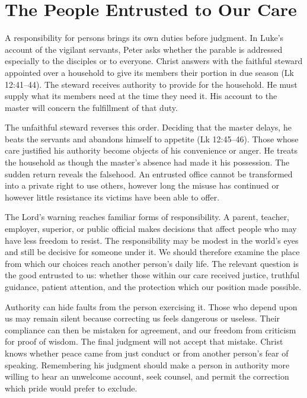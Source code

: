 \section{The People Entrusted to Our Care}

A responsibility for persons brings its own duties before judgment. In Luke's account of the vigilant servants, Peter asks whether the parable is addressed especially to the disciples or to everyone. Christ answers with the faithful steward appointed over a household to give its members their portion in due season (Lk 12:41--44). The steward receives authority to provide for the household. He must supply what its members need at the time they need it. His account to the master will concern the fulfillment of that duty.

The unfaithful steward reverses this order. Deciding that the master delays, he beats the servants and abandons himself to appetite (Lk 12:45--46). Those whose care justified his authority become objects of his convenience or anger. He treats the household as though the master's absence had made it his possession. The sudden return reveals the falsehood. An entrusted office cannot be transformed into a private right to use others, however long the misuse has continued or however little resistance its victims have been able to offer.

The Lord's warning reaches familiar forms of responsibility. A parent, teacher, employer, superior, or public official makes decisions that affect people who may have less freedom to resist. The responsibility may be modest in the world's eyes and still be decisive for someone under it. We should therefore examine the place from which our choices reach another person's daily life. The relevant question is the good entrusted to us: whether those within our care received justice, truthful guidance, patient attention, and the protection which our position made possible.

Authority can hide faults from the person exercising it. Those who depend upon us may remain silent because correcting us feels dangerous or useless. Their compliance can then be mistaken for agreement, and our freedom from criticism for proof of wisdom. The final judgment will not accept that mistake. Christ knows whether peace came from just conduct or from another person's fear of speaking. Remembering his judgment should make a person in authority more willing to hear an unwelcome account, seek counsel, and permit the correction which pride would prefer to exclude.

